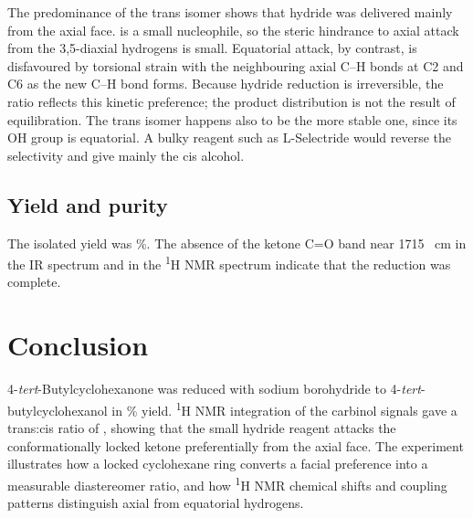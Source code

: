\documentclass[11pt,a4paper]{article}
\begin{document}
The predominance of the trans isomer shows that hydride was delivered mainly from the axial face.  is a small nucleophile, so the steric hindrance to axial attack from the 3,5-diaxial hydrogens is small. Equatorial attack, by contrast, is disfavoured by torsional strain with the neighbouring axial C--H bonds at C2 and C6 as the new C--H bond forms.\cite{Clayden2012} Because hydride reduction is irreversible, the ratio reflects this kinetic preference; the product distribution is not the result of equilibration. The trans isomer happens also to be the more stable one, since its OH group is equatorial. A bulky reagent such as L-Selectride would reverse the selectivity and give mainly the cis alcohol.\cite{Brown1972}

\subsection{Yield and purity}
The isolated yield was \%. The absence of the ketone C=O band near 1715 \si{\per\centi\metre} in the IR spectrum and  in the \textsuperscript{1}H NMR spectrum indicate that the reduction was complete.

\section{Conclusion}
4-\emph{tert}-Butylcyclohexanone was reduced with sodium borohydride to 4-\emph{tert}-butylcyclohexanol in \% yield. \textsuperscript{1}H NMR integration of the carbinol signals gave a trans:cis ratio of , showing that the small hydride reagent attacks the conformationally locked ketone preferentially from the axial face. The experiment illustrates how a locked cyclohexane ring converts a facial preference into a measurable diastereomer ratio, and how \textsuperscript{1}H NMR chemical shifts and coupling patterns distinguish axial from equatorial hydrogens.
\end{document}
